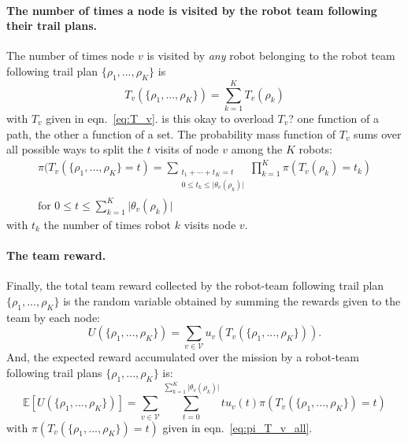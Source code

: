 \documentclass[11pt, oneside]{article}
\begin{document}
\paragraph{The number of times a node is visited by the robot team following their trail plans.} 
The number of times node $v$ is visited by \emph{any} robot belonging to the robot team following trail plan $\{\rho_1, ..., \rho_K\}$ is
\begin{equation}
	T_v(\{\rho_1, ..., \rho_K\} ) = \sum_{k=1}^K T_v(\rho_k)
\end{equation} with $T_v$ given in eqn.~\ref{eq:T_v}.
{\color{red} is this okay to overload $T_v$? one function of a path, the other a function of a set.}
The probability mass function of $T_v$ sums over all possible ways to split the $t$ visits of node $v$ among the $K$ robots:
\begin{multline}
	\pi(T_v(\{\rho_1, ..., \rho_K\} = t) = 
	\sum_{\substack{t_1 + \cdots + t_K = t \\ 0 \leq t_k \leq  \lvert \theta_v(\rho_k) \rvert}}
	\prod_{k=1}^K \pi(T_v(\rho_k)=t_k) \\
	\text{for } 0 \leq t \leq \sum_{k=1}^K \lvert \theta_v(\rho_k) \rvert \label{eq:pi_T_v_all}
\end{multline} with $t_k $ the number of times robot $k$ visits node $v$.



\paragraph{The team reward.}
Finally, the total team reward collected by the robot-team following trail plan $\{\rho_1, ..., \rho_K\}$ is the random variable obtained by summing the rewards given to the team by each node:
\begin{equation}
U(\{\rho_1,...,\rho_K\}) = \sum_{v\in\mathcal{V}} u_v\left ( T_v(\{\rho_1, ..., \rho_K\}) \right).
\end{equation}
And, the expected reward accumulated over the mission by a robot-team following trail plans $\{\rho_1, ..., \rho_K\}$ is:
\begin{equation}
	\mathbb{E}[U(\{\rho_1,...,\rho_K\})]= \sum_{v\in\mathcal{V}} \sum_{t= 0}^{\sum_{k=1}^K \lvert \theta_v(\rho_k) \rvert } t u_v(t) \pi(T_v(\{\rho_1, ..., \rho_K\}) = t) \label{eq:formula_obj1}
\end{equation}
with $ \pi(T_v(\{\rho_1, ..., \rho_K\}) = t)$ given in eqn.~\ref{eq:pi_T_v_all}.
\end{document}
